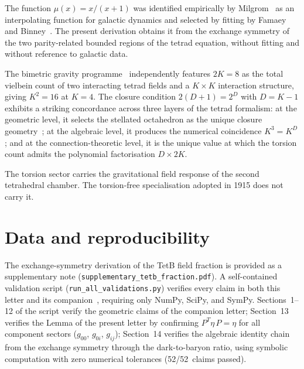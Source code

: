 \documentclass[twocolumn]{iopjournal}
\begin{document}
The function $\mu(x) = x/(x+1)$ was identified empirically by
Milgrom~\cite{Milgrom1983} as an interpolating function for
galactic dynamics and selected by fitting by Famaey and
Binney~\cite{FamaeyBinney2005}. The present derivation obtains
it from the exchange symmetry of the two parity-related bounded
regions of the tetrad equation, without fitting and without
reference to galactic data.

The bimetric gravity programme~\cite{HR2012a} independently
features $2K = 8$ as the total vielbein count of two interacting
tetrad fields and a $K \times K$ interaction structure, giving
$K^2 = 16$ at $K = 4$. The closure condition
$2(D{+}1) = 2^D$ with $D = K - 1$ exhibits a striking
concordance across three layers of the tetrad formalism: at the
geometric level, it selects the stellated octahedron as the
unique closure geometry~\cite{Nelson2026a}; at the algebraic
level, it produces the numerical coincidence $K^3 = K^D$; and
at the connection-theoretic level, it is the unique value at
which the torsion count admits the polynomial factorisation
$D \times 2K$.

The torsion sector carries the gravitational field response of
the second tetrahedral chamber. The torsion-free specialisation
adopted in 1915 does not carry it.


\section{Data and reproducibility}

The exchange-symmetry derivation of the TetB field fraction is
provided as a supplementary note
(\texttt{supplementary\_tetb\_fraction.pdf}). A self-contained
validation script (\texttt{run\_all\_validations.py}) verifies
every claim in both this letter and its
companion~\cite{Nelson2026a}, requiring only NumPy, SciPy,
and SymPy. Sections~1--12 of the script verify the geometric
claims of the companion letter; Section~13 verifies the
Lemma of the present letter by confirming $P^T \eta\, P = \eta$
for all component sectors ($g_{00}$, $g_{0i}$, $g_{ij}$);
Section~14 verifies the algebraic identity chain from the
exchange symmetry through the dark-to-baryon ratio, using
symbolic computation with zero numerical tolerances
(52/52~claims passed).

\end{document}
